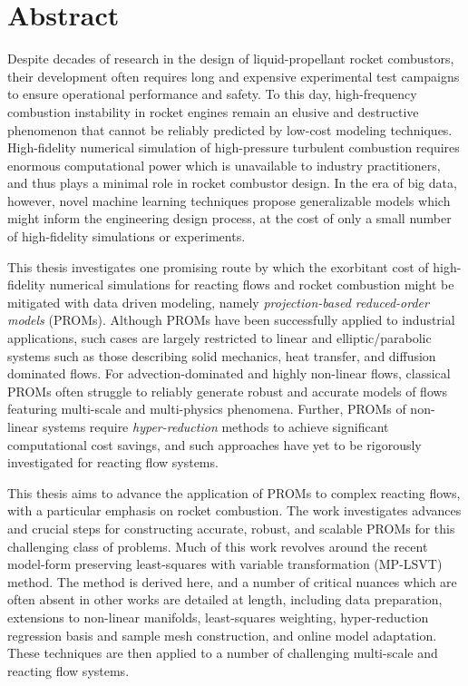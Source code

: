 \chapter{Abstract}

Despite decades of research in the design of liquid-propellant rocket combustors, their development often requires long and expensive experimental test campaigns to ensure operational performance and safety. To this day, high-frequency combustion instability in rocket engines remain an elusive and destructive phenomenon that cannot be reliably predicted by low-cost modeling techniques. High-fidelity numerical simulation of high-pressure turbulent combustion requires enormous computational power which is unavailable to industry practitioners, and thus plays a minimal role in rocket combustor design. In the era of big data, however, novel machine learning techniques propose generalizable models which might inform the engineering design process, at the cost of only a small number of high-fidelity simulations or experiments.

This thesis investigates one promising route by which the exorbitant cost of high-fidelity numerical simulations for reacting flows and rocket combustion might be mitigated with data driven modeling, namely \textit{projection-based reduced-order models} (PROMs). Although PROMs have been successfully applied to industrial applications, such cases are largely restricted to linear and elliptic/parabolic systems such as those describing solid mechanics, heat transfer, and diffusion dominated flows. For advection-dominated and highly non-linear flows, classical PROMs often struggle to reliably generate robust and accurate models of flows featuring multi-scale and multi-physics phenomena. Further, PROMs of non-linear systems require \textit{hyper-reduction} methods to achieve significant computational cost savings, and such approaches have yet to be rigorously investigated for reacting flow systems.

This thesis aims to advance the application of PROMs to complex reacting flows, with a particular emphasis on rocket combustion. The work investigates advances and crucial steps for constructing accurate, robust, and scalable PROMs for this challenging class of problems. Much of this work revolves around the recent model-form preserving least-squares with variable transformation (MP-LSVT) method. The method is derived here, and a number of critical nuances which are often absent in other works are detailed at length, including data preparation, extensions to non-linear manifolds, least-squares weighting, hyper-reduction regression basis and sample mesh construction, and online model adaptation. These techniques are then applied to a number of challenging multi-scale and reacting flow systems.

